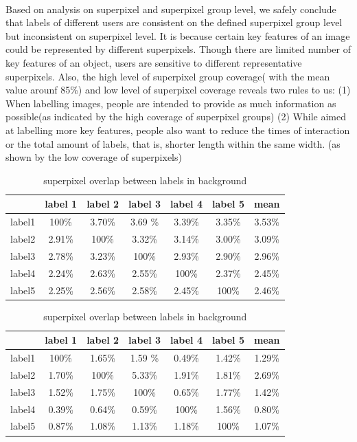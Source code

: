 \documentclass[runningheads,a4paper]{llncs}
\begin{document}
\paragraph{}Based on analysis on superpixel and superpixel group level, we safely conclude that labels of different users are consistent on the defined superpixel group level but inconsistent on superpixel level. It is because certain key features of an image could be represented by different superpixels. Though there are limited number of key features of an object, users are sensitive to different representative superpixels. Also, the high level of superpixel group coverage( with the mean value arounf 85\%) and low level of superpixel coverage reveals two rules to us: (1) When labelling images, people are intended to provide as much information as possible(as indicated by the high coverage of superpixel groups)  (2) While aimed at labelling more key features, people also want to reduce the times of interaction or the total amount of labels, that is, shorter length within the same width. (as shown by the low coverage of superpixels)




\begin{table}
\parbox{.35\linewidth}{
\centering
\begin{tabular}{|c|c|c|c|c|c|c|}
\hline
 & label 1 & label 2&label 3&label 4&label 5&mean\\
\hline
label1& 100\% & 3.70\% & 3.69	\%& 3.39\%& 3.35\%& 3.53\%\\
\hline
label2& 2.91\% & 100\% & 3.32\%& 3.14\%& 3.00\% & 3.09\%\\
\hline
label3& 2.78\% & 3.23\% & 100\%& 2.93\%& 2.90\%& 2.96\% \\
\hline
label4& 2.24\% & 2.63\% & 2.55\%& 100\%& 2.37\%& 2.45\%\\
\hline
label5& 2.25\% & 2.56\% & 2.58\%& 2.45\%& 100\%& 2.46\% \\
\hline
\end{tabular}
\captionsetup{justification=centerlast}
\caption{superpixel overlap between labels in foreground}
\label{ta: sp overlap f}
}
\hfill
\parbox{.35\linewidth}{
\centering
\begin{tabular}{|c|c|c|c|c|c|c|}
\hline
 & label 1 & label 2&label 3&label 4&label 5&mean\\
\hline
label1& 100\% & 1.65\% & 1.59	\%& 0.49\%& 1.42\%& 1.29\%\\
\hline
label2& 1.70\% & 100\% & 5.33\%& 1.91\%& 1.81\%& 2.69\% \\
\hline
label3& 1.52\% & 1.75\% & 100\%& 0.65\%& 1.77\%& 1.42\% \\
\hline
label4& 0.39\% & 0.64\% & 0.59\%& 100\%& 1.56\%& 0.80\%\\
\hline
label5& 0.87\% & 1.08\% & 1.13\%& 1.18\%& 100\%& 1.07\% \\
\hline
\end{tabular}
\captionsetup{justification=centerlast}
\caption{superpixel overlap between labels in background}
\label{ta: sp overlap b}
}
\label{ta: sp overlap}
\end{table}
\end{document}
